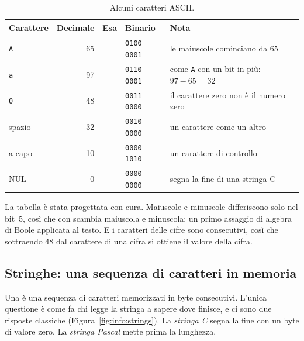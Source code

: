 \begin{table}[htb]
\centering\small
\caption{Alcuni caratteri ASCII.}\label{tab:info:ascii}
\begin{tabularx}{\textwidth}{@{}lrllL@{}}
\toprule
\textbf{Carattere} & \textbf{Decimale} & \textbf{Esa} & \textbf{Binario} & \textbf{Nota}\\
\midrule
\texttt{A} & 65 &  & \texttt{0100 0001} & le maiuscole cominciano da 65\\
\texttt{a} & 97 &  & \texttt{0110 0001} & come \texttt{A} con un bit in più: $97-65=32$\\
\texttt{0} & 48 &  & \texttt{0011 0000} & il carattere zero non è il numero zero\\
spazio & 32 &  & \texttt{0010 0000} & un carattere come un altro\\
a capo & 10 &  & \texttt{0000 1010} & un carattere di controllo\\
NUL & 0 &  & \texttt{0000 0000} & segna la fine di una stringa C\\
\bottomrule
\end{tabularx}
\end{table}

La tabella è stata progettata con cura. Maiuscole e minuscole differiscono solo
nel bit~5, così che  con  scambia maiuscola e minuscola: un
primo assaggio di algebra di Boole applicata al testo. E i caratteri delle
cifre sono consecutivi, così che sottraendo 48 dal carattere di una cifra si
ottiene il valore della cifra.

\subsection{Stringhe: una sequenza di caratteri in memoria}

Una  è una sequenza di caratteri memorizzati in byte consecutivi.
L'unica questione è come fa chi legge la stringa a sapere dove finisce, e ci
sono due risposte classiche (Figura~\ref{fig:info:strings}). La \emph{stringa
C} segna la fine con un byte di valore zero. La \emph{stringa Pascal} mette
prima la lunghezza.

